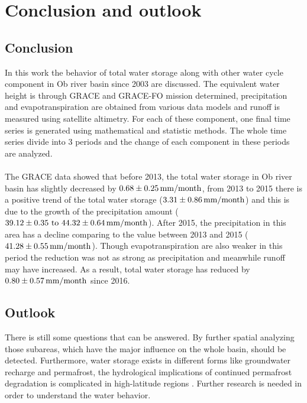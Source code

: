 \chapter{Conclusion and outlook}
\section{Conclusion}
In this work the behavior of total water storage along with other water cycle component in Ob river basin since 2003 are discussed. The equivalent water height is through GRACE and GRACE-FO mission determined, precipitation and evapotranspiration are obtained from various data models and runoff is measured using satellite altimetry. For each of these component, one final time series is generated using mathematical and statistic methods. The whole time series divide into 3 periods and the change of each component in these periods are analyzed. \\\\
The GRACE data showed that before 2013, the total water storage in Ob river basin has slightly decreased by $0.68 \pm 0.25 \,\mathrm{mm/month}$, from 2013 to 2015 there is a positive trend of the total water storage ($3.31 \pm 0.86 \,\mathrm{mm/month}$) and this is due to the growth of the precipitation amount ($39.12 \pm 0.35\ \text{to} \ 44.32\pm 0.64 \ut{mm/month}$). After 2015, the precipitation in this area has a decline comparing to the value between 2013 and 2015 ($41.28 \pm 0.55 \,\mathrm{mm/month}$). Though evapotranspiration are also weaker in this period the reduction was not as strong as precipitation and meanwhile runoff may have increased. As a result, total water storage has reduced by $0.80 \pm 0.57 \,\mathrm{mm/month}$ since 2016. 
\section{Outlook}
There is still some questions that can be answered. By further spatial analyzing those subareas, which have the major influence on the whole basin, should be detected. Furthermore, water storage exists in different forms like groundwater recharge and permafrost, the hydrological implications of continued permafrost degradation is complicated in high-latitude regions  \cite{young2020conceptual}. Further research is needed in order to understand the water behavior. 
